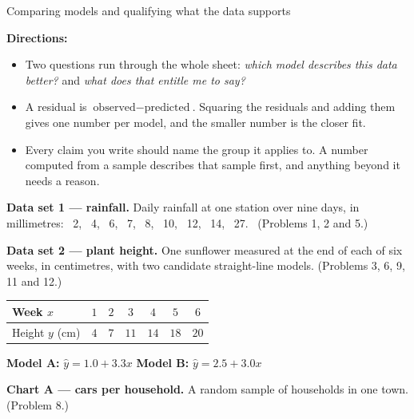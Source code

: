 \documentclass[12pt]{article}
\begin{document}

\begin{center}
Comparing models and qualifying what the data supports
\end{center}

\noindent\textbf{Directions:}
\begin{itemize}[leftmargin=1.2cm, itemsep=2pt]
  \item Two questions run through the whole sheet: \emph{which model describes this data better?} and \emph{what does that entitle me to say?}
  \item A residual is $\text{observed} - \text{predicted}$. Squaring the residuals and adding them gives one number per model, and the smaller number is the closer fit.
  \item Every claim you write should name the group it applies to. A number computed from a sample describes that sample first, and anything beyond it needs a reason.
\end{itemize}

\vspace{0.15cm}
\noindent\textbf{Data set 1 --- rainfall.} Daily rainfall at one station over nine
days, in millimetres:
\ 2, \ 4, \ 6, \ 7, \ 8, \ 10, \ 12, \ 14, \ 27. \ (Problems 1, 2 and 5.)

\vspace{0.2cm}
\noindent\textbf{Data set 2 --- plant height.} One sunflower measured at the end
of each of six weeks, in centimetres, with two candidate straight-line models.
(Problems 3, 6, 9, 11 and 12.)

\begin{center}
\begin{tabular}{|l|c|c|c|c|c|c|}
\hline
Week $x$ & $1$ & $2$ & $3$ & $4$ & $5$ & $6$ \\ \hline
Height $y$ (cm) & $4$ & $7$ & $11$ & $14$ & $18$ & $20$ \\ \hline
\end{tabular}
\end{center}
\vspace{-0.1cm}
\begin{center}
\textbf{Model A:} $\hat{y} = 1.0 + 3.3x$ \qquad
\textbf{Model B:} $\hat{y} = 2.5 + 3.0x$
\end{center}

\vspace{0.1cm}
\noindent\textbf{Chart A --- cars per household.} A random sample of households
in one town. (Problem 8.)
\end{document}
